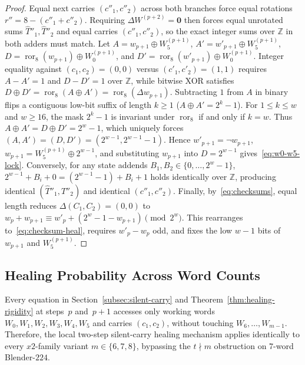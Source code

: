 \documentclass[11pt,a4paper]{article}
\theoremstyle{definition}
\theoremstyle{remark}
\newcommand{\ror}{\operatorname{ror}}
\begin{document}
\begin{proof}
Equal next carries $(c''_1, c''_2)$ across both branches force equal rotations $r'' = 8 - (c''_1 + c''_2)$. Requiring $\Delta W^{(p+2)} = \mathbf{0}$ then forces equal unrotated sums $\hat{T}''_1, \hat{T}''_2$ and equal carries $(c''_1, c''_2)$, so the exact integer sums over $\mathbb{Z}$ in both adders must match. Let $A = w_{p+1} \oplus W^{(p+1)}_5$, $A' = w'_{p+1} \oplus W^{(p+1)}_5$, $D = \ror_8(w_{p+1}) \oplus W^{(p+1)}_0$, and $D' = \ror_8(w'_{p+1}) \oplus W^{(p+1)}_0$. Integer equality against $(c_1, c_2) = (0,0)$ versus $(c'_1, c'_2) = (1,1)$ requires $A - A' = 1$ and $D - D' = 1$ over $\mathbb{Z}$, while bitwise XOR satisfies $D \oplus D' = \ror_8(A \oplus A') = \ror_8(\Delta w_{p+1})$. Subtracting $1$ from $A$ in binary flips a contiguous low-bit suffix of length $k \ge 1$ ($A \oplus A' = 2^k - 1$). For $1 \le k \le w$ and $w \ge 16$, the mask $2^k - 1$ is invariant under $\ror_8$ if and only if $k = w$. Thus $A \oplus A' = D \oplus D' = 2^w - 1$, which uniquely forces $(A, A') = (D, D') = (2^{w-1}, 2^{w-1} - 1)$. Hence $w'_{p+1} = \neg w_{p+1}$, $w_{p+1} = W^{(p+1)}_5 \oplus 2^{w-1}$, and substituting $w_{p+1}$ into $D = 2^{w-1}$ gives~\eqref{eq:w0-w5-lock}. Conversely, for any state addends $B_1, B_2 \in \{0, \dots, 2^w - 1\}$, $2^{w-1} + B_i + 0 = (2^{w-1} - 1) + B_i + 1$ holds identically over $\mathbb{Z}$, producing identical $(\hat{T}''_1, \hat{T}''_2)$ and identical $(c''_1, c''_2)$. Finally, by~\eqref{eq:checksums}, equal length reduces $\Delta(C_1, C_2) = (0,0)$ to $w_p + w_{p+1} \equiv w'_p + (2^w - 1 - w_{p+1}) \pmod{2^w}$. This rearranges to~\eqref{eq:checksum-heal}, requires $w'_p - w_p$ odd, and fixes the low $w - 1$ bits of $w_{p+1}$ and $W^{(p+1)}_5$.
\end{proof}

\subsection{Healing Probability Across Word Counts}
\label{subsec:healing-density}
Every equation in Section~\ref{subsec:silent-carry} and Theorem~\ref{thm:healing-rigidity} at steps~$p$ and~$p+1$ accesses only working words $W_0, W_1, W_2, W_3, W_4, W_5$ and carries $(c_1, c_2)$, without touching $W_6, \dots, W_{m-1}$. Therefore, the local two-step silent-carry healing mechanism applies identically to every $x2$-family variant $m \in \{6, 7, 8\}$, bypassing the $t \nmid m$ obstruction on $7$-word Blender-$224$.
\end{document}
